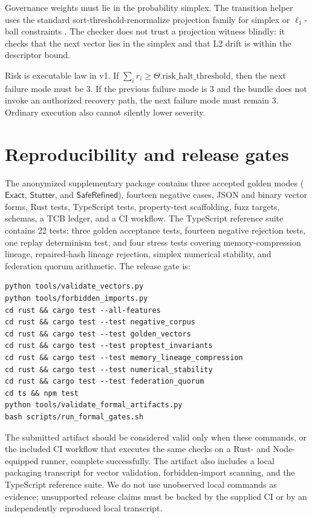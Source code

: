 \documentclass{article}
\newcommand{\Exact}{\ensuremath{\mathsf{Exact}}}
\newcommand{\Stutter}{\ensuremath{\mathsf{Stutter}}}
\newcommand{\SafeRefined}{\ensuremath{\mathsf{SafeRefined}}}
\begin{document}
Governance weights must lie in the probability simplex. The transition helper uses the standard sort-threshold-renormalize projection family for simplex or $\ell_1$-ball constraints \citep{duchi2008projection,wang2013simplex}. The checker does not trust a projection witness blindly: it checks that the next vector lies in the simplex and that L2 drift is within the descriptor bound.

Risk is executable law in v1. If $\sum_i r_i \geq \Theta.\mathrm{risk\_halt\_threshold}$, then the next failure mode must be 3. If the previous failure mode is 3 and the bundle does not invoke an authorized recovery path, the next failure mode must remain 3. Ordinary execution also cannot silently lower severity.

\section{Reproducibility and release gates}
The anonymized supplementary package contains three accepted golden modes (\Exact, \Stutter, and \SafeRefined), fourteen negative cases, JSON and binary vector forms, Rust tests, TypeScript tests, property-test scaffolding, fuzz targets, schemas, a TCB ledger, and a CI workflow. The TypeScript reference suite contains 22 tests: three golden acceptance tests, fourteen negative rejection tests, one replay determinism test, and four stress tests covering memory-compression lineage, repaired-hash lineage rejection, simplex numerical stability, and federation quorum arithmetic. The release gate is:
\begin{lstlisting}[caption={Release gate used by local and CI validation.}]
python tools/validate_vectors.py
python tools/forbidden_imports.py
cd rust && cargo test --all-features
cd rust && cargo test --test negative_corpus
cd rust && cargo test --test golden_vectors
cd rust && cargo test --test proptest_invariants
cd rust && cargo test --test memory_lineage_compression
cd rust && cargo test --test numerical_stability
cd rust && cargo test --test federation_quorum
cd ts && npm test
python tools/validate_formal_artifacts.py
bash scripts/run_formal_gates.sh
\end{lstlisting}
The submitted artifact should be considered valid only when these commands, or the included CI workflow that executes the same checks on a Rust- and Node-equipped runner, complete successfully. The artifact also includes a local packaging transcript for vector validation, forbidden-import scanning, and the TypeScript reference suite. We do not use unobserved local commands as evidence; unsupported release claims must be backed by the supplied CI or by an independently reproduced local transcript.
\end{document}

